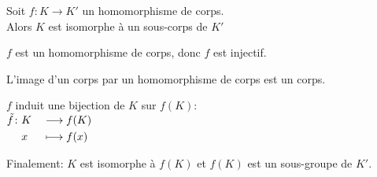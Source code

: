\documentclass[12pt,twoside,a4paper]{article}
\begin{document}
		\begin{coro}
			Soit $f:K\rightarrow K'$ un homomorphisme de corps.\\
			Alors $K$ est isomorphe \`a un sous-corps de $K'$
		\end{coro}
		\begin{preuve}
			\begin{liste}
				\item $f$ est un homomorphisme de corps, donc $f$ est injectif.
				\item L'image d'un corps par un homomorphisme de corps est un corps.
				\item $f$ induit une bijection de $K$ sur $f(K)$:\\
					$\begin{aligned}[t]\tilde{f}\colon&K&&\longrightarrow f(K) \\&x&&\longmapsto f(x)\end{aligned}$
			\end{liste}
			\begin{flushleft}
				Finalement: $K$ est isomorphe \`a $f(K)$ et $f(K)$ est un sous-groupe de $K'$.
			\end{flushleft}
		\end{preuve}
\end{document}
